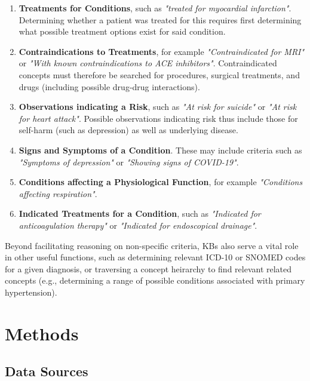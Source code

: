 \documentclass[../main.tex]{subfiles}
\begin{document}
\begin{enumerate}
    \item \textbf{Treatments for Conditions}, such as \textit{"treated for myocardial infarction"}. Determining whether a patient was treated for this requires first determining what possible treatment options exist for said condition.
    \item \textbf{Contraindications to Treatments}, for example \textit{"Contraindicated for MRI"} or \textit{"With known contraindications to ACE inhibitors"}. Contraindicated concepts must therefore be searched for procedures, surgical treatments, and drugs (including possible drug-drug interactions).
    \item \textbf{Observations indicating a Risk}, such as \textit{"At risk for suicide"} or \textit{"At risk for heart attack"}. Possible observations indicating risk thus include those for self-harm (such as depression) as well as underlying disease.
    \item \textbf{Signs and Symptoms of a Condition}. These may include criteria such as \textit{"Symptoms of depression"} or \textit{"Showing signs of COVID-19"}.
    \item \textbf{Conditions affecting a Physiological Function}, for example \textit{"Conditions affecting respiration"}.
    \item \textbf{Indicated Treatments for a Condition}, such as \textit{"Indicated for anticoagulation therapy"} or \textit{"Indicated for endoscopical drainage"}. 
\end{enumerate}

Beyond facilitating reasoning on non-specific criteria, KBs also serve a vital role in other useful functions, such as determining relevant ICD-10 or SNOMED codes for a given diagnosis, or traversing a concept heirarchy to find relevant related concepts (e.g., determining a range of possible conditions associated with primary hypertension).

\section{Methods}

\subsection{Data Sources}
\end{document}
